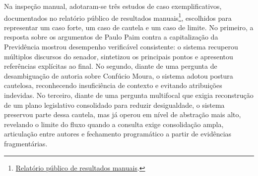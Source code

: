 Na inspeção manual, adotaram-se três estudos de caso exemplificativos, documentados no relatório público de resultados manuais\footnote{\href{https://github.com/fabriciosantana/mcdia/blob/main/05-iag/4-project/eval-openwebui/RESULTS.md}{Relatório público de resultados manuais}.}, escolhidos para representar um caso forte, um caso de cautela e um caso de limite. No primeiro, a resposta sobre os argumentos de Paulo Paim contra a capitalização da Previdência mostrou desempenho verificável consistente: o sistema recuperou múltiplos discursos do senador, sintetizou os principais pontos e apresentou referências explícitas ao final. No segundo, diante de uma pergunta de desambiguação de autoria sobre Confúcio Moura, o sistema adotou postura cautelosa, reconhecendo insuficiência de contexto e evitando atribuições indevidas. No terceiro, diante de uma pergunta multifocal que exigia reconstrução de um plano legislativo consolidado para reduzir desigualdade, o sistema preservou parte dessa cautela, mas já operou em nível de abstração mais alto, revelando o limite do fluxo quando a consulta exige consolidação ampla, articulação entre autores e fechamento programático a partir de evidências fragmentárias.

